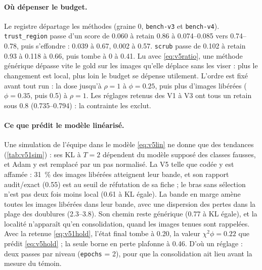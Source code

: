 \documentclass[11pt,a4paper]{article}
\newcommand{\code}[1]{\texttt{#1}}
\begin{document}
\paragraph{Où dépenser le budget.} Le registre départage les méthodes (graine 0, \code{bench-v3} et
\code{bench-v4}). \code{trust\_region} passe d'un score de \num{0.060} à retain \num{0.86} à
\numrange{0.074}{0.085} vers \numrange{0.74}{0.78}, puis s'effondre : \num{0.039} à \num{0.67},
\num{0.002} à \num{0.57}. \code{scrub} passe de \num{0.102} à retain \num{0.93} à \num{0.118} à
\num{0.66}, puis tombe à 0 à \num{0.41}. Lu avec \eqref{eq:v5ratio}, une méthode générique dépasse
vite le gold sur les images qu'elle déplace sans les viser : plus le changement est local, plus loin
le budget se dépense utilement. L'ordre est fixé avant tout run : la dose jusqu'à $\rho=1$ à
$\phi=\num{0.25}$, puis plus d'images libérées ($\phi=\num{0.35}$, puis \num{0.5}) à $\rho=1$. Les
réglages retenus des V1 à V3 ont tous un retain sous \num{0.8} (\numrange{0.735}{0.794}) : la
contrainte les exclut.

\paragraph{Ce que prédit le modèle linéarisé.} Une simulation de l'équipe dans le modèle
\eqref{eq:v5lin} ne donne que des tendances (\cref{tab:v51sim}) : ses KL à $T=2$ dépendent du modèle
supposé des classes fausses, et Adam y est remplacé par un pas normalisé. La V5 telle que codée y est
affamée : \SI{31}{\percent} des images libérées atteignent leur bande, et son rapport audit/exact
(\num{0.55}) est au seuil de réfutation de sa fiche ; le bras sans sélection n'est pas deux fois moins
local (\num{0.61} à KL égale). La bande en marge amène toutes les images libérées dans leur bande,
avec une dispersion des pertes dans la plage des doublures (\numrange{2.3}{3.8}). Son chemin reste
générique (\num{0.77} à KL égale), et la localité n'apparaît qu'en consolidation, quand les images
tenues sont rappelées. Avec la retenue \eqref{eq:v51hold}, l'état final tombe à \num{0.20}, la valeur
$\chi^2\phi=\num{0.22}$ que prédit \eqref{eq:v5hold} ; la seule borne en perte plafonne à \num{0.46}.
D'où un réglage : deux passes par niveau (\code{epochs} = 2), pour que la consolidation ait lieu
avant la mesure du témoin.
\end{document}
